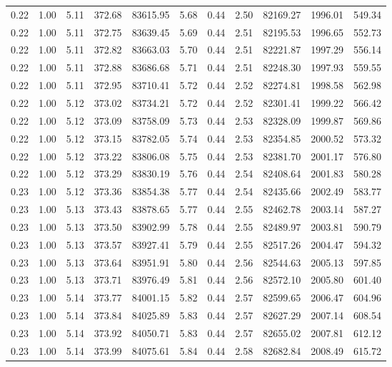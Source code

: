 \begin{table}[!ht]
\begin{tabular}{rrrrrrrrrrr}
0.22 & 1.00 & 5.11 & 372.68 & 83615.95 & 5.68 & 0.44 & 2.50 & 82169.27 & 1996.01 & 549.34 \\
0.22 & 1.00 & 5.11 & 372.75 & 83639.45 & 5.69 & 0.44 & 2.51 & 82195.53 & 1996.65 & 552.73 \\
0.22 & 1.00 & 5.11 & 372.82 & 83663.03 & 5.70 & 0.44 & 2.51 & 82221.87 & 1997.29 & 556.14 \\
0.22 & 1.00 & 5.11 & 372.88 & 83686.68 & 5.71 & 0.44 & 2.51 & 82248.30 & 1997.93 & 559.55 \\
0.22 & 1.00 & 5.11 & 372.95 & 83710.41 & 5.72 & 0.44 & 2.52 & 82274.81 & 1998.58 & 562.98 \\
0.22 & 1.00 & 5.12 & 373.02 & 83734.21 & 5.72 & 0.44 & 2.52 & 82301.41 & 1999.22 & 566.42 \\
0.22 & 1.00 & 5.12 & 373.09 & 83758.09 & 5.73 & 0.44 & 2.53 & 82328.09 & 1999.87 & 569.86 \\
0.22 & 1.00 & 5.12 & 373.15 & 83782.05 & 5.74 & 0.44 & 2.53 & 82354.85 & 2000.52 & 573.32 \\
0.22 & 1.00 & 5.12 & 373.22 & 83806.08 & 5.75 & 0.44 & 2.53 & 82381.70 & 2001.17 & 576.80 \\
0.22 & 1.00 & 5.12 & 373.29 & 83830.19 & 5.76 & 0.44 & 2.54 & 82408.64 & 2001.83 & 580.28 \\
0.23 & 1.00 & 5.12 & 373.36 & 83854.38 & 5.77 & 0.44 & 2.54 & 82435.66 & 2002.49 & 583.77 \\
0.23 & 1.00 & 5.13 & 373.43 & 83878.65 & 5.77 & 0.44 & 2.55 & 82462.78 & 2003.14 & 587.27 \\
0.23 & 1.00 & 5.13 & 373.50 & 83902.99 & 5.78 & 0.44 & 2.55 & 82489.97 & 2003.81 & 590.79 \\
0.23 & 1.00 & 5.13 & 373.57 & 83927.41 & 5.79 & 0.44 & 2.55 & 82517.26 & 2004.47 & 594.32 \\
0.23 & 1.00 & 5.13 & 373.64 & 83951.91 & 5.80 & 0.44 & 2.56 & 82544.63 & 2005.13 & 597.85 \\
0.23 & 1.00 & 5.13 & 373.71 & 83976.49 & 5.81 & 0.44 & 2.56 & 82572.10 & 2005.80 & 601.40 \\
0.23 & 1.00 & 5.14 & 373.77 & 84001.15 & 5.82 & 0.44 & 2.57 & 82599.65 & 2006.47 & 604.96 \\
0.23 & 1.00 & 5.14 & 373.84 & 84025.89 & 5.83 & 0.44 & 2.57 & 82627.29 & 2007.14 & 608.54 \\
0.23 & 1.00 & 5.14 & 373.92 & 84050.71 & 5.83 & 0.44 & 2.57 & 82655.02 & 2007.81 & 612.12 \\
0.23 & 1.00 & 5.14 & 373.99 & 84075.61 & 5.84 & 0.44 & 2.58 & 82682.84 & 2008.49 & 615.72 \\

\end{tabular}
\end{table}
